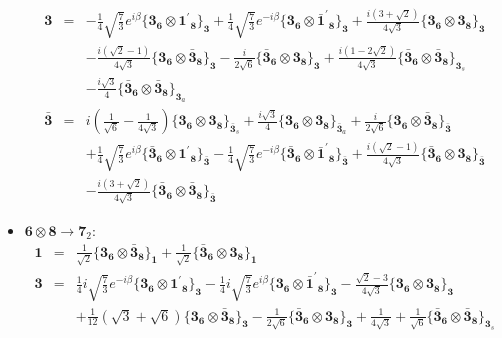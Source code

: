 \documentclass[english]{article}
\newcommand{\subcg}[3]{\big\{ {#1}\otimes{#2}\big\}^{}_{#3}}
\newcommand{\rep}[1]{\mathbf{#1}}
\begin{document}
\begin{itemize}
\begin{eqnarray*}
\\
\rep{3} &=& -\frac{1}{4} \sqrt{\frac{7}{3}} e^{i \beta }\subcg{\rep{3}_{\rep{6}}}{\rep{1^{\prime}}_{\rep{8}}}{\rep{3}}+\frac{1}{4} \sqrt{\frac{7}{3}} e^{-i \beta }\subcg{\rep{3}_{\rep{6}}}{\rep{\bar{1}^{\prime}}_{\rep{8}}}{\rep{3}}+\frac{i \left(3+\sqrt{2}\right)}{4 \sqrt{3}}\subcg{\rep{3}_{\rep{6}}}{\rep{3}_{\rep{8}}}{\rep{3}} \\ 
 & & -\frac{i \left(\sqrt{2}-1\right)}{4 \sqrt{3}}\subcg{\rep{3}_{\rep{6}}}{\rep{\bar{3}}_{\rep{8}}}{\rep{3}}-\frac{i}{2 \sqrt{6}}\subcg{\rep{\bar{3}}_{\rep{6}}}{\rep{3}_{\rep{8}}}{\rep{3}}+\frac{i \left(1-2 \sqrt{2}\right)}{4 \sqrt{3}}\subcg{\rep{\bar{3}}_{\rep{6}}}{\rep{\bar{3}}_{\rep{8}}}{\rep{3}_{s}} \\ 
 & & -\frac{i \sqrt{3}}{4}\subcg{\rep{\bar{3}}_{\rep{6}}}{\rep{\bar{3}}_{\rep{8}}}{\rep{3}_{a}}
\\
\rep{\bar{3}} &=& i \left(\frac{1}{\sqrt{6}}-\frac{1}{4 \sqrt{3}}\right)\subcg{\rep{3}_{\rep{6}}}{\rep{3}_{\rep{8}}}{\rep{\bar{3}}_{s}}+\frac{i \sqrt{3}}{4}\subcg{\rep{3}_{\rep{6}}}{\rep{3}_{\rep{8}}}{\rep{\bar{3}}_{a}}+\frac{i}{2 \sqrt{6}}\subcg{\rep{3}_{\rep{6}}}{\rep{\bar{3}}_{\rep{8}}}{\rep{\bar{3}}} \\ 
 & & +\frac{1}{4} \sqrt{\frac{7}{3}} e^{i \beta }\subcg{\rep{\bar{3}}_{\rep{6}}}{\rep{1^{\prime}}_{\rep{8}}}{\rep{\bar{3}}}-\frac{1}{4} \sqrt{\frac{7}{3}} e^{-i \beta }\subcg{\rep{\bar{3}}_{\rep{6}}}{\rep{\bar{1}^{\prime}}_{\rep{8}}}{\rep{\bar{3}}}+\frac{i \left(\sqrt{2}-1\right)}{4 \sqrt{3}}\subcg{\rep{\bar{3}}_{\rep{6}}}{\rep{3}_{\rep{8}}}{\rep{\bar{3}}} \\ 
 & & -\frac{i \left(3+\sqrt{2}\right)}{4 \sqrt{3}}\subcg{\rep{\bar{3}}_{\rep{6}}}{\rep{\bar{3}}_{\rep{8}}}{\rep{\bar{3}}}
\end{eqnarray*}
\item $\rep{6}\otimes\rep{8}\to\rep{7}_{2}$:
\begin{eqnarray*}
\rep{1} &=& \frac{1}{\sqrt{2}}\subcg{\rep{3}_{\rep{6}}}{\rep{\bar{3}}_{\rep{8}}}{\rep{1}}+\frac{1}{\sqrt{2}}\subcg{\rep{\bar{3}}_{\rep{6}}}{\rep{3}_{\rep{8}}}{\rep{1}}
\\
\rep{3} &=& \frac{1}{4} i \sqrt{\frac{7}{3}} e^{-i \beta }\subcg{\rep{3}_{\rep{6}}}{\rep{1^{\prime}}_{\rep{8}}}{\rep{3}}-\frac{1}{4} i \sqrt{\frac{7}{3}} e^{i \beta }\subcg{\rep{3}_{\rep{6}}}{\rep{\bar{1}^{\prime}}_{\rep{8}}}{\rep{3}}-\frac{\sqrt{2}-3}{4 \sqrt{3}}\subcg{\rep{3}_{\rep{6}}}{\rep{3}_{\rep{8}}}{\rep{3}} \\ 
 & & +\frac{1}{12} \left(\sqrt{3}+\sqrt{6}\right)\subcg{\rep{3}_{\rep{6}}}{\rep{\bar{3}}_{\rep{8}}}{\rep{3}}-\frac{1}{2 \sqrt{6}}\subcg{\rep{\bar{3}}_{\rep{6}}}{\rep{3}_{\rep{8}}}{\rep{3}}+\frac{1}{4 \sqrt{3}}+\frac{1}{\sqrt{6}}\subcg{\rep{\bar{3}}_{\rep{6}}}{\rep{\bar{3}}_{\rep{8}}}{\rep{3}_{s}} \\ 

\end{eqnarray*}
\end{itemize}
\end{document}
